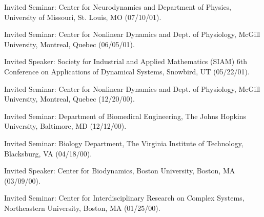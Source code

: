 \item Invited Seminar: Center for Neurodynamics and Department of Physics, University
of Missouri, St. Louis, MO (07/10/01).

\item Invited Seminar: Center for Nonlinear
Dynamics and Dept. of Physiology, McGill University, Montreal,
Quebec (06/05/01).

\item Invited Speaker: Society for Industrial
and Applied Mathematics (SIAM) 6th Conference on Applications of
Dynamical Systems, Snowbird, UT (05/22/01).

\item Invited Seminar: Center for Nonlinear
Dynamics and Dept. of Physiology, McGill University, Montreal,
Quebec (12/20/00).

\item Invited Seminar: Department of Biomedical Engineering,
The Johns Hopkins University, Baltimore, MD (12/12/00).

\item Invited Seminar: Biology Department,
The Virginia Institute of Technology, Blacksburg, VA (04/18/00).

\item Invited Speaker: Center for
Biodynamics, Boston University, Boston, MA (03/09/00).

\item Invited Seminar: Center for
Interdisciplinary Research on Complex Systems, Northeastern
University, Boston, MA (01/25/00).